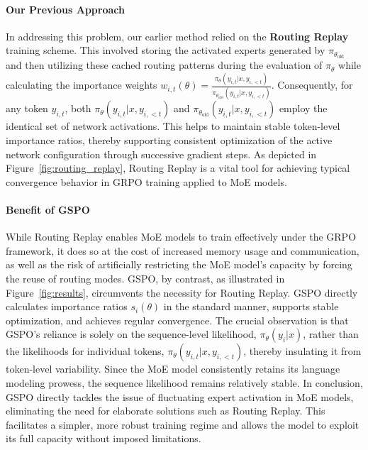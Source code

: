 \paragraph{Our Previous Approach} In addressing this problem, our earlier method relied on the \textbf{Routing Replay} training scheme. This involved storing the activated experts generated by $\pi_{\theta_\text{old}}$ and then utilizing these cached routing patterns during the evaluation of $\pi_{\theta}$ while calculating the importance weights $w_{i,t}(\theta) = \frac{ \pi_{\theta} (y_{i,t} | x, y_{i,<t}) }{ \pi_{\theta_\text{old}} (y_{i,t} | x,y_{i,<t})}$. Consequently, for any token $y_{i,t}$, both $\pi_{\theta} (y_{i,t} | x, y_{i,<t})$ and $\pi_{\theta_\text{old}} (y_{i,t} | x,y_{i,<t})$ employ the identical set of network activations. This helps to maintain stable token-level importance ratios, thereby supporting consistent optimization of the active network configuration through successive gradient steps. As depicted in Figure~\ref{fig:routing_replay}, Routing Replay is a vital tool for achieving typical convergence behavior in GRPO training applied to MoE models.

\paragraph{Benefit of GSPO} While Routing Replay enables MoE models to train effectively under the GRPO framework, it does so at the cost of increased memory usage and communication, as well as the risk of artificially restricting the MoE model's capacity by forcing the reuse of routing modes. GSPO, by contrast, as illustrated in Figure~\ref{fig:results}, circumvents the necessity for Routing Replay. GSPO directly calculates importance ratios $s_i(\theta)$ in the standard manner, supports stable optimization, and achieves regular convergence. The crucial observation is that GSPO’s reliance is solely on the sequence-level likelihood, $\pi_{\theta} (y_i | x)$, rather than the likelihoods for individual tokens, $\pi_{\theta} (y_{i,t} | x, y_{i,<t})$, thereby insulating it from token-level variability. Since the MoE model consistently retains its language modeling prowess, the sequence likelihood remains relatively stable. In conclusion, GSPO directly tackles the issue of fluctuating expert activation in MoE models, eliminating the need for elaborate solutions such as Routing Replay. This facilitates a simpler, more robust training regime and allows the model to exploit its full capacity without imposed limitations.

